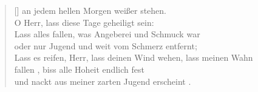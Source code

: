 \documentclass[8pt]{beamer}
\begin{document}
\begin{frame}
\begin{center}
\begin{minipage}[t]{\dimexpr\versewidth+1sp\relax}
\begin{verse}[\versewidth]
				an jedem hellen Morgen wei{\ss}er stehen. \\
				O Herr, lass diese Tage geheiligt sein: \\
				Lass alles fallen, was Angeberei und Schmuck
				war \\
				oder nur Jugend und weit vom Schmerz entfernt;
				\\
				Lass es reifen, Herr, lass deinen Wind wehen,
				lass meinen Wahn \\
				fallen , biss alle Hoheit endlich fest
				\\
				und nackt aus meiner zarten Jugend erscheint .
			\end{verse}
		\end{minipage}
	\end{center}
\end{frame}
\end{document}
